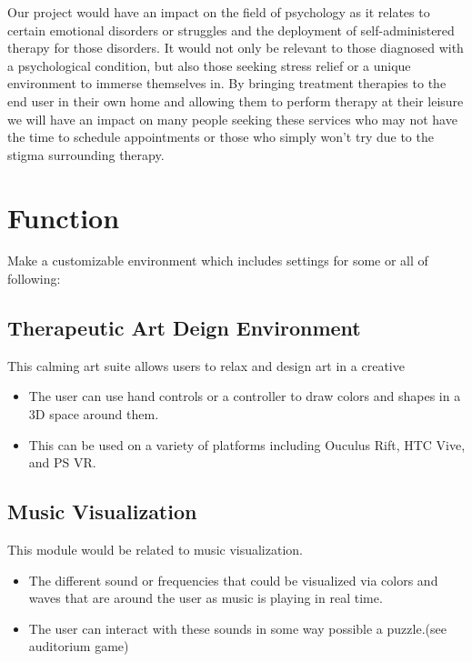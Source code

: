 \documentclass[a4paper,10pt]{article}
\begin{document}
	
	Our project would have an impact on the field of psychology as it relates to certain emotional disorders or struggles and the deployment of self-administered therapy for those disorders. It would not only be relevant to those diagnosed with a psychological condition, but also those seeking stress relief or a unique environment to immerse themselves in. By bringing treatment therapies to the end user in their own home and allowing them to perform therapy at their leisure we will have an impact on many people seeking these services who may not have the time to schedule appointments or those who simply won't try due to the stigma surrounding therapy.
	\pagebreak
	\section{Function}
	Make a customizable environment which includes settings for some or all of following:
	\subsection{Therapeutic Art Deign Environment}
	This calming art suite allows users to relax and design art in a creative 
	\begin{itemize}
		\item The user can use hand controls or a controller to draw colors and shapes in a 3D space around them. 
		\item This can be used on a variety of platforms including Ouculus Rift, HTC Vive, and PS VR.
	\end{itemize}   
	\subsection{Music Visualization}
	This module would be related to music visualization. 
	\begin{itemize}
		\item The different sound or frequencies that could be visualized via colors and waves that are around the user as music is playing in real time.
		\item The user can interact with these sounds in some way possible a puzzle.(see auditorium game)
	\end{itemize}   
\end{document}
